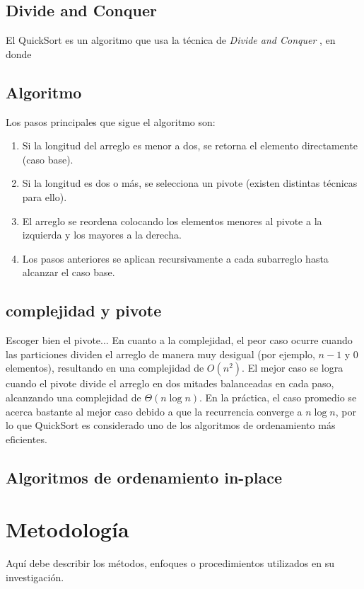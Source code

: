 \documentclass[conference]{IEEEtran}
\begin{document}
\subsection{Divide and Conquer}
El QuickSort es un algoritmo que usa la técnica de \textit{Divide and Conquer} \cite{history}, en donde 


\subsection{Algoritmo}
Los pasos principales que sigue el algoritmo son:
\begin{enumerate}
    \item Si la longitud del arreglo es menor a dos, se retorna el elemento directamente (caso base).
    \item Si la longitud es dos o más, se selecciona un pivote (existen distintas técnicas para ello).
    \item El arreglo se reordena colocando los elementos menores al pivote a la izquierda y los mayores a la derecha.
    \item Los pasos anteriores se aplican recursivamente a cada subarreglo hasta alcanzar el caso base.
\end{enumerate}
\subsection{complejidad y pivote}
Escoger bien el pivote...
En cuanto a la complejidad, el peor caso ocurre cuando las particiones dividen el arreglo de manera muy desigual (por ejemplo, $n-1$ y $0$ elementos), resultando en una complejidad de $O(n^2)$. El mejor caso se logra cuando el pivote divide el arreglo en dos mitades balanceadas en cada paso, alcanzando una complejidad de $\Theta(n \log n)$. En la práctica, el caso promedio se acerca bastante al mejor caso debido a que la recurrencia converge a $n \log n$, por lo que QuickSort es considerado uno de los algoritmos de ordenamiento más eficientes.
\subsection{Algoritmos de ordenamiento in-place}

\section{Metodología}
Aquí debe describir los métodos, enfoques o procedimientos utilizados en su investigación.
\end{document}
